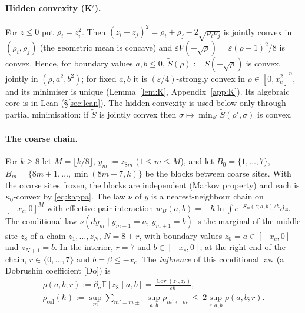 \documentclass[11pt,a4paper]{article}
\theoremstyle{definition}
\theoremstyle{remark}
\newcommand{\E}{\mathbb{E}}
\newcommand{\Cov}{\operatorname{Cov}}
\newcommand{\xc}{x_c}
\newcommand{\rcol}{\rho_{\mathrm{col}}}
\begin{document}
\paragraph{Hidden convexity (K$'$).} For $z\le0$ put $\rho_i=z_i^2$. Then $(z_i-z_j)^2=\rho_i+\rho_j-2\sqrt{\rho_i\rho_j}$ is jointly convex in $(\rho_i,\rho_j)$ (the geometric mean is concave) and $\varepsilon V(-\sqrt\rho)=\varepsilon(\rho-1)^2/8$ is convex. Hence, for boundary values $a,b\le0$, $\tilde S(\rho):=S(-\sqrt\rho)$ is convex, jointly in $(\rho,a^2,b^2)$; for fixed $a,b$ it is $(\varepsilon/4)$-strongly convex in $\rho\in[0,\xc^2]^n$, and its minimiser is unique (Lemma~\ref{lem:K}, Appendix~\ref{app:K}). Its algebraic core is in Lean (\S\ref{sec:lean}). The hidden convexity is used below only through partial minimisation: if $\tilde S$ is jointly convex then $\sigma\mapsto\min_{\rho'}\tilde S(\rho',\sigma)$ is convex.

\paragraph{The coarse chain.} For $k\ge8$ let $M=\lfloor k/8\rfloor$, $y_m:=z_{8m}$ ($1\le m\le M$), and let $B_0=\{1,\dots,7\}$, $B_m=\{8m+1,\dots,\min(8m+7,k)\}$ be the blocks between coarse sites. With the coarse sites frozen, the blocks are independent (Markov property) and each is $\kappa_0$-convex by \eqref{eq:kappa}. The law $\nu$ of $y$ is a nearest-neighbour chain on $[-\xc,0]^M$ with effective pair interaction $w_B(a,b)=-\hbar\ln\int e^{-S_B(z;a,b)/\hbar}dz$. The conditional law $\nu(dy_m\mid y_{m-1}=a,\,y_{m+1}=b)$ is the marginal of the middle site $z_8$ of a chain $z_1,\dots,z_N$, $N=8+r$, with boundary values $z_0=a\in[-\xc,0]$ and $z_{N+1}=b$. In the interior, $r=7$ and $b\in[-\xc,0]$; at the right end of the chain, $r\in\{0,\dots,7\}$ and $b=\beta\le-\xc$. The \emph{influence} of this conditional law (a Dobrushin coefficient [Do]) is
\begin{gather*}
\rho(a,b;r):=\partial_a\E[z_8\mid a,b]=\frac{\Cov(z_1,z_8)}{\varepsilon\hbar},\\
\rcol(\hbar):=\sup_m\sum_{m'=m\pm1}\sup_{a,b}\rho_{m'\leftarrow m}\ \le\ 2\sup_{r,a,b}\rho(a,b;r).
\end{gather*}
\end{document}
